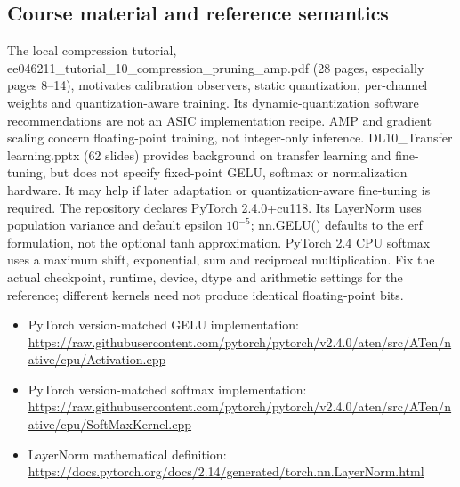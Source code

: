 \documentclass[11pt,a4paper]{article}
\begin{document}
\subsection{Course material and reference semantics}
The local compression tutorial, ee046211\_tutorial\_10\_compression\_pruning\_amp.pdf (28 pages, especially pages 8--14), motivates calibration observers, static quantization, per-channel weights and quantization-aware training. Its dynamic-quantization software recommendations are not an ASIC implementation recipe. AMP and gradient scaling concern floating-point training, not integer-only inference.
DL10\_Transfer learning.pptx (62 slides) provides background on transfer learning and fine-tuning, but does not specify fixed-point GELU, softmax or normalization hardware. It may help if later adaptation or quantization-aware fine-tuning is required.
The repository declares PyTorch 2.4.0+cu118. Its LayerNorm uses population variance and default epsilon $10^{-5}$; nn.GELU() defaults to the erf formulation, not the optional tanh approximation. PyTorch 2.4 CPU softmax uses a maximum shift, exponential, sum and reciprocal multiplication. Fix the actual checkpoint, runtime, device, dtype and arithmetic settings for the reference; different kernels need not produce identical floating-point bits.
\begin{itemize}
\item PyTorch version-matched GELU implementation: \url{https://raw.githubusercontent.com/pytorch/pytorch/v2.4.0/aten/src/ATen/native/cpu/Activation.cpp}
\item PyTorch version-matched softmax implementation: \url{https://raw.githubusercontent.com/pytorch/pytorch/v2.4.0/aten/src/ATen/native/cpu/SoftMaxKernel.cpp}
\item LayerNorm mathematical definition: \url{https://docs.pytorch.org/docs/2.14/generated/torch.nn.LayerNorm.html}
\end{itemize}
\end{document}

